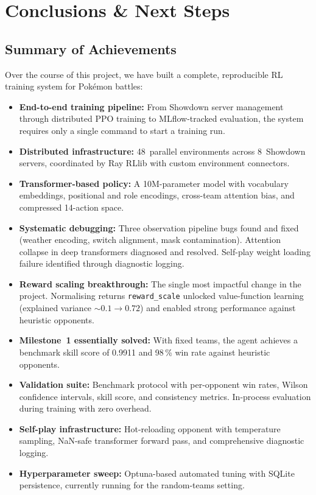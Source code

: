 \chapter{Conclusions \& Next Steps}
\label{ch:conclusions}

\section{Summary of Achievements}

Over the course of this project, we have built a complete, reproducible RL
training system for Pok\'{e}mon battles:

\begin{itemize}
  \item \textbf{End-to-end training pipeline:} From Showdown server management
        through distributed PPO training to MLflow-tracked evaluation, the
        system requires only a single command to start a training run.
  \item \textbf{Distributed infrastructure:} 48~parallel environments across
        8~Showdown servers, coordinated by Ray RLlib with custom environment
        connectors.
  \item \textbf{Transformer-based policy:} A 10M-parameter model with
        vocabulary embeddings, positional and role encodings, cross-team
        attention bias, and compressed 14-action space.
  \item \textbf{Systematic debugging:} Three observation pipeline bugs found
        and fixed (weather encoding, switch alignment, mask contamination).
        Attention collapse in deep transformers diagnosed and resolved.
        Self-play weight loading failure identified through diagnostic
        logging.
  \item \textbf{Reward scaling breakthrough:} The single most impactful change
        in the project.  Normalising returns \texttt{reward\_scale} unlocked value-function learning
        (explained variance ${\sim}0.1 \to 0.72$) and enabled strong
        performance against heuristic opponents.
  \item \textbf{Milestone~1 essentially solved:} With fixed teams, the agent
        achieves a benchmark skill score of 0.9911 and 98\,\% win rate against
        heuristic opponents.
  \item \textbf{Validation suite:} Benchmark protocol with per-opponent win
        rates, Wilson confidence intervals, skill score, and consistency
        metrics.  In-process evaluation during training with zero overhead.
  \item \textbf{Self-play infrastructure:} Hot-reloading opponent with
        temperature sampling, NaN-safe transformer forward pass, and
        comprehensive diagnostic logging.
  \item \textbf{Hyperparameter sweep:} Optuna-based automated tuning with
        SQLite persistence, currently running for the random-teams setting.
\end{itemize}


